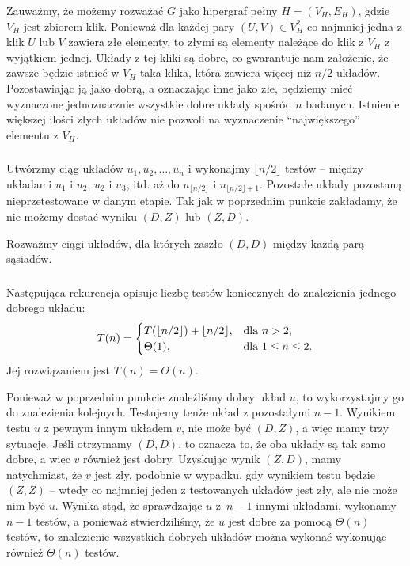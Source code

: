 Zauważmy, że możemy rozważać $G$ jako hipergraf pełny $H=(V_H,E_H)$, gdzie $V_H$ jest zbiorem klik. Ponieważ dla każdej pary $(U,V)\in V_H^2$ co najmniej jedna z klik $U$ lub $V$ zawiera złe elementy, to złymi są elementy należące do klik z $V_H$ z wyjątkiem jednej. Układy z tej kliki są dobre, co gwarantuje nam założenie, że zawsze będzie istnieć w $V_H$ taka klika, która zawiera więcej niż $n/2$ układów. Pozostawiając ją jako dobrą, a oznaczając inne jako złe, będziemy mieć wyznaczone jednoznacznie wszystkie dobre układy spośród $n$ badanych. Istnienie większej ilości złych układów nie pozwoli na wyznaczenie ``największego'' elementu z $V_H$.

\subsubsection{} %
Utwórzmy ciąg układów $u_1,u_2,\dots,u_n$ i wykonajmy $\lfloor n/2\rfloor$ testów -- między układami $u_1$ i $u_2$, $u_2$ i $u_3$, itd. aż do $u_{\lfloor n/2\rfloor}$ i $u_{\lfloor n/2\rfloor+1}$. Pozostałe układy pozostaną nieprzetestowane w danym etapie. Tak jak w poprzednim punkcie zakładamy, że nie możemy dostać wyniku $(D,Z)$ lub $(Z,D)$.

Rozważmy ciągi układów, dla których zaszło $(D,D)$ między każdą parą sąsiadów. 

\subsubsection{} %
Następująca rekurencja opisuje liczbę testów koniecznych do znalezienia jednego dobrego układu:
\[
	T(n) =
	\begin{cases}
		T(\lfloor n/2\rfloor) + \lfloor n/2\rfloor, & \hbox{dla }n>2, \\
		\Theta(1), & \hbox{dla }1\le n\le 2.
	\end{cases}
\]
Jej rozwiązaniem jest $T(n)=\Theta(n)$.

Ponieważ w poprzednim punkcie znaleźliśmy dobry układ $u$, to wykorzystajmy go do znalezienia kolejnych. Testujemy tenże układ z pozostałymi $n-1$. Wynikiem testu $u$ z pewnym innym układem $v$, nie może być $(D,Z)$, a więc mamy trzy sytuacje. Jeśli otrzymamy $(D,D)$, to oznacza to, że oba układy są tak samo dobre, a więc $v$ również jest dobry. Uzyskując wynik $(Z,D)$, mamy natychmiast, że $v$ jest zły, podobnie w wypadku, gdy wynikiem testu będzie $(Z,Z)$ -- wtedy co najmniej jeden z testowanych układów jest zły, ale nie może nim być $u$. Wynika stąd, że sprawdzając $u$ z~$n-1$ innymi układami, wykonamy $n-1$ testów, a ponieważ stwierdziliśmy, że $u$ jest dobre za pomocą $\Theta(n)$ testów, to znalezienie wszystkich dobrych układów można wykonać wykonując również $\Theta(n)$ testów.

